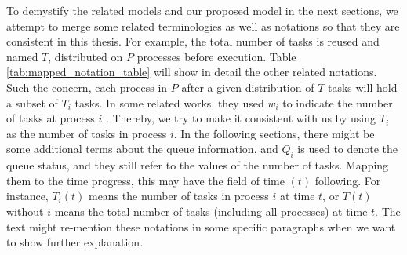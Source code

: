 To demystify the related models and our proposed model in the next sections, we attempt to merge some related terminologies as well as notations so that they are consistent in this thesis. For example, the total number of tasks is reused and named $T$, distributed on $P$ processes before execution. Table \ref{tab:mapped_notation_table} will show in detail the other related notations. Such the concern, each process in $P$ after a given distribution of $T$ tasks will hold a subset of $T_{i}$ tasks. In some related works, they used $w_{i}$ to indicate the number of tasks at process $i$  \cite{tchiboukdjian2013decentralized}. Thereby, we try to make it consistent with us by using $T_{i}$ as the number of tasks in process $i$. In the following sections, there might be some additional terms about the queue information, and $Q_{i}$ is used to denote the queue status, and they still refer to the values of the number of tasks. Mapping them to the time progress, this may have the field of time $(t)$ following. For instance, $T_{i}(t)$ means the number of tasks in process $i$ at time $t$, or $T(t)$ without $i$ means the total number of tasks (including all processes) at time $t$. The text might re-mention these notations in some specific paragraphs when we want to show further explanation.\\

